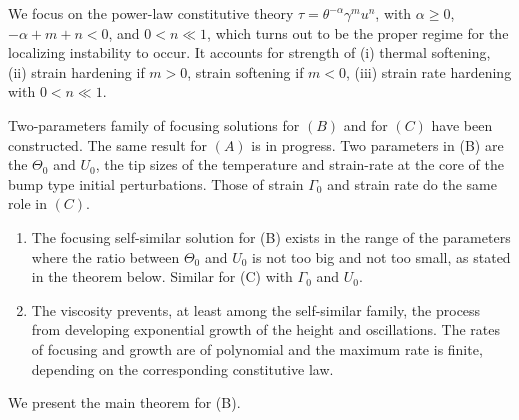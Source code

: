 \documentclass[a4paper,11pt]{article}
\begin{document}
We focus on the power-law constitutive theory $\tau = \theta^{-\alpha}\gamma^m u^n$, with $\alpha\ge0$, $-\alpha+m+n<0$, and $0<n\ll1$, which turns out to be the proper regime for the localizing instability to occur. It accounts for strength of (i) thermal softening, (ii) strain hardening if $m>0$, strain softening if $m<0$, (iii) strain rate hardening with $0<n\ll1$.

Two-parameters family of focusing solutions for $(B)$ and for $(C)$ have been constructed. The same result for $(A)$ is in progress. Two parameters in (B) are the $\Theta_0$ and $U_0$, the tip sizes of the temperature and strain-rate at the core of the bump type initial perturbations. Those of strain $\Gamma_0$ and strain rate do the same role in $(C)$.  
\begin{enumerate}
 \item The focusing self-similar solution for (B) exists in the range of the parameters where the ratio between $\Theta_0$ and $U_0$  is not too big and not too small, as stated in the theorem below. Similar for (C) with $\Gamma_0$ and $U_0$.
 \item The viscosity prevents, at least among the self-similar family, the process from developing exponential growth of the height and oscillations. The rates of focusing and growth are of polynomial and the maximum rate is finite, depending on the corresponding constitutive law.
\end{enumerate}
We present the main theorem for (B).
\end{document}
